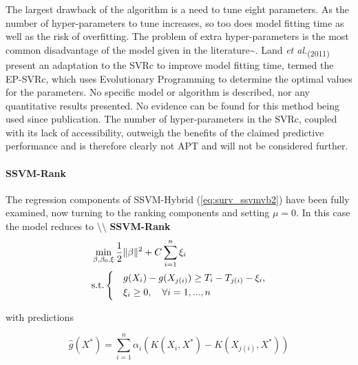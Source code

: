 \documentclass[
  letterpaper,
]{scrbook}
\let\oldparagraph\paragraph
\renewcommand{\paragraph}[1]{\oldparagraph{#1}\mbox{}}
\theoremstyle{plain}
\theoremstyle{definition}
\theoremstyle{remark}
\begin{document}
The largest drawback of the algorithm is a need to tune eight
parameters. As the number of hyper-parameters to tune increases, so too
does model fitting time as well as the risk of overfitting. The problem
of extra hyper-parameters is the most common disadvantage of the model
given in the literature\textasciitilde{}\cite{pkgsurvivalsvm, Land2011}.
Land \textit{et al.}\textsubscript{(2011)}\cite{Land2011} present an
adaptation to the SVRc to improve model fitting time, termed the
EP-SVRc, which uses Evolutionary Programming to determine the optimal
values for the parameters. No specific model or algorithm is described,
nor any quantitative results presented. No evidence can be found for
this method being used since publication. The number of hyper-parameters
in the SVRc, coupled with its lack of accessibility, outweigh the
benefits of the claimed predictive performance and is therefore clearly
not APT and will not be considered further.

\paragraph{SSVM-Rank}\label{mod:svmem}

The regression components of SSVM-Hybrid (\ref{eq:surv_ssvmvb2}) have
been fully examined, now turning to the ranking components and setting
\(\mu = 0\). In this case the model reduces to
\textbackslash\textbackslash{}
\textbf{SSVM-Rank}\label{mod:ranksvmc}\label{mod:ssvmvb1} \[
\begin{aligned}
& \min_{\beta, \beta_0, \xi} \frac{1}{2}\|\beta\|^2 + C\sum_{i =1}^n \xi_i \\
& \textrm{s.t.}
\begin{dcases}
& g(X_i) - g(X_{j(i)}) \geq T_i - T_{j(i)} - \xi_i, \\
& \xi_i \geq 0, \quad \forall i = 1,...,n \\
\end{dcases}
\end{aligned}
\]

with predictions

\[
\hat{g}(X^*) = \sum^n_{i=1} \alpha_i(K(X_i, X^*) - K(X_{j(i)}, X^*))
\]
\end{document}
